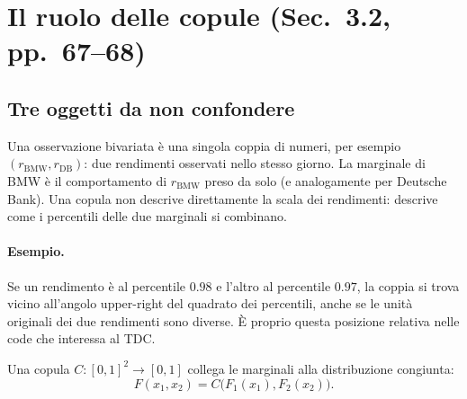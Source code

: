 \documentclass[11pt,a4paper]{article}
\newcommand{\Esempio}{\paragraph{Esempio.}}
\begin{document}
\section{Il ruolo delle copule (Sec.~3.2, pp.~67--68)}

\subsection{Tre oggetti da non confondere}
Una osservazione bivariata è una singola coppia di numeri, per esempio
$(r_{\mathrm{BMW}},r_{\mathrm{DB}})$: due rendimenti osservati nello stesso
giorno. La marginale di BMW è il comportamento di $r_{\mathrm{BMW}}$ preso da
solo (e analogamente per Deutsche Bank). Una copula non descrive direttamente
la scala dei rendimenti: descrive come i percentili delle due marginali si
combinano.

\Esempio Se un rendimento è al percentile $0.98$ e l'altro al percentile
$0.97$, la coppia si trova vicino all'angolo upper-right del quadrato dei
percentili, anche se le unità originali dei due rendimenti sono diverse. È
proprio questa posizione relativa nelle code che interessa al TDC.

Una copula $C:[0,1]^2\to[0,1]$ collega le marginali alla distribuzione
congiunta:
\begin{equation}
  F(x_1,x_2)=C\bigl(F_1(x_1),F_2(x_2)\bigr).
  \label{eq:sklar}
\end{equation}
\end{document}

